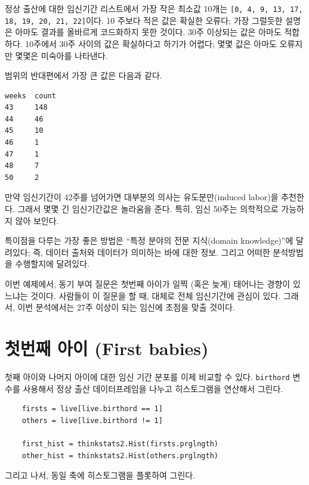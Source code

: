 정상 출산에 대한 임신기간 리스트에서 가장 작은 최소값 10개는 {\tt [0, 4, 9, 13, 17, 18, 19, 20, 21, 22]}이다. 10 주보다 적은 값은 확실한 오류다; 가장 그럴듯한 설명은 아마도 결과를 올바르게 코드화하지 못한 것이다. 30주 이상되는 값은 아마도 적합하다. 10주에서 30주 사이의 값은 확실하다고 하기가 어렵다; 몇몇 값은 아마도 오류지만 몇몇은 미숙아를 나타낸다.


범위의 반대편에서 가장 큰 값은 다음과 같다.

%
\begin{verbatim}
weeks  count
43     148
44     46
45     10
46     1
47     1
48     7
50     2
\end{verbatim}

만약 임신기간이 42주를 넘어가면 대부분의 의사는 유도분만(induced labor)을 추천한다.
그래서 몇몇 긴 임신기간값은 놀라움을 준다. 특히, 임신 50주는 의학적으로 가능하지 않아 보인다.

특이점을 다루는 가장 좋은 방법은 ``특정 분야의 전문 지식(domain knowledge)''에 달려있다; 즉, 데이터 출처와 데이터가 의미하는 바에 대한 정보. 그리고 어떠한 분석방법을 수행할지에 달려있다.


이번 예제에서, 동기 부여 질문은 첫번째 아이가 일찍 (혹은 늦게) 태어나는 경향이 있느냐는 것이다.
사람들이 이 질문을 할 때, 대체로 전체 임신기간에 관심이 있다. 그래서, 이번 분석에서는 27주 이상이 되는 
임신에 초점을 맞출 것이다. 


\section{첫번째 아이 (First babies)}

첫째 아이와 나머지 아이에 대한 임신 기간 분포를 이제 비교할 수 있다.
{\tt birthord} 변수를 사용해서 정상 출산 데이터프레임을 나누고 히스토그램을 연산해서 그린다.


\begin{verbatim}
    firsts = live[live.birthord == 1]
    others = live[live.birthord != 1]

    first_hist = thinkstats2.Hist(firsts.prglngth)
    other_hist = thinkstats2.Hist(others.prglngth)
\end{verbatim}

그리고 나서, 동일 축에 히스토그램을 플롯하여 그린다.

